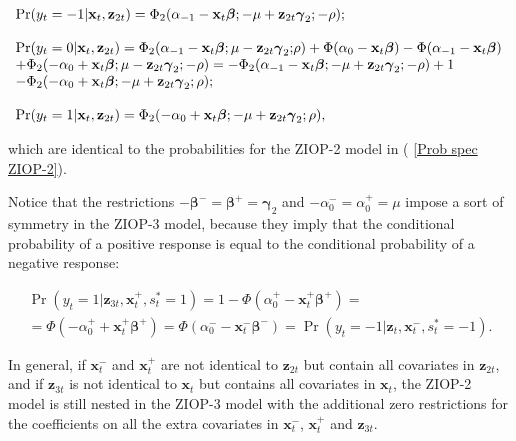 \documentclass[letterpaper,fleqn,12pt]{article}
\begin{document}
\bigskip

$%
\begin{array}{l}
\Pr (y_{t}=-1|\mathbf{x}_{t},\mathbf{z}_{2t})=\Phi _{2}(\alpha _{-1}-\mathbf{%
x}_{t}\mathbf{\beta };-\mu +\mathbf{z}_{2t}\mathbf{\gamma }_{2}\mathbf{;-}%
\rho ); \\ 
\\ 
\Pr (y_{t}=0|\mathbf{x}_{t},\mathbf{z}_{2t})=\Phi _{2}(\alpha _{-1}-\mathbf{x%
}_{t}\mathbf{\beta };\mu -\mathbf{z}_{2t}\mathbf{\gamma }_{2}\mathbf{;}\rho
)+\Phi (\alpha _{0}-\mathbf{x}_{t}\mathbf{\beta })-\Phi (\alpha _{-1}-%
\mathbf{x}_{t}\mathbf{\beta }) \\ 
+\Phi _{2}(-\alpha _{0}+\mathbf{x}_{t}\mathbf{\beta };\mu -\mathbf{z}_{2t}%
\mathbf{\gamma }_{2};\mathbf{-}\rho )=-\Phi _{2}(\alpha _{-1}-\mathbf{x}_{t}%
\mathbf{\beta };-\mu +\mathbf{z}_{2t}\mathbf{\gamma }_{2}\mathbf{;-}\rho )+1
\\ 
-\Phi _{2}(-\alpha _{0}+\mathbf{x}_{t}\mathbf{\beta };-\mu +\mathbf{z}_{2t}%
\mathbf{\gamma }_{2};\rho ); \\ 
\\ 
\Pr (y_{t}=1|\mathbf{x}_{t},\mathbf{z}_{2t})=\Phi _{2}(-\alpha _{0}+\mathbf{x%
}_{t}\mathbf{\beta };-\mu +\mathbf{z}_{2t}\mathbf{\gamma }_{2};\rho ),%
\end{array}%
$

\bigskip

\noindent which are identical to the probabilities for the ZIOP-2 model in (%
\ref{Prob spec ZIOP-2}).

Notice that the restrictions $-\mathbf{\beta }^{-}=\mathbf{\beta }^{+}=%
\mathbf{\gamma }_{2}$ and $-\alpha _{0}^{-}=\alpha _{0}^{+}=\mu $ impose a
sort of symmetry in the ZIOP-3 model, because they imply that the
conditional probability of a positive response is equal to the conditional
probability of a negative response:

\medskip

\begin{gather*}
\Pr (y_{t}=1|\mathbf{z}_{3t},\mathbf{x}_{t}^{+},s_{t}^{\ast }=1)=1-\Phi
(\alpha _{0}^{+}-\mathbf{x}_{t}^{+}\mathbf{\beta }^{+})= \\
=\Phi (-\alpha _{0}^{+}+\mathbf{x}_{t}^{+}\mathbf{\beta }^{+})=\Phi (\alpha
_{0}^{-}-\mathbf{x}_{t}^{-}\mathbf{\beta }^{-})=\Pr (y_{t}=-1|\mathbf{z}_{t},%
\mathbf{x}_{t}^{-},s_{t}^{\ast }=-1)\text{.}
\end{gather*}

\medskip

In general, if $\mathbf{x}_{t}^{-}$ and $\mathbf{x}_{t}^{+}$ are not
identical to $\mathbf{z}_{2t}$ but contain all covariates in $\mathbf{z}%
_{2t} $, and if $\mathbf{z}_{3t}$ is not identical to $\mathbf{x}_{t}$ but
contains all covariates in $\mathbf{x}_{t}$, the ZIOP-2 model is still
nested in the ZIOP-3 model with the additional zero restrictions for the
coefficients on all the extra covariates in $\mathbf{x}_{t}^{-}$, $\mathbf{x}%
_{t}^{+}$ and $\mathbf{z}_{3t}$.
\end{document}
